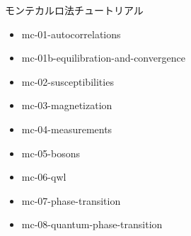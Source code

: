 \begin{frame}[t,fragile]{モンテカルロ法チュートリアル}
  \begin{itemize}
  \item mc-01-autocorrelations
  \item mc-01b-equilibration-and-convergence
  \item mc-02-susceptibilities
  \item mc-03-magnetization
  \item mc-04-measurements
  \item mc-05-bosons
  \item mc-06-qwl
  \item mc-07-phase-transition
  \item mc-08-quantum-phase-transition
  \end{itemize}
\end{frame}


